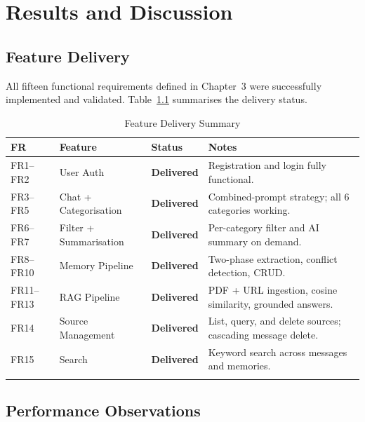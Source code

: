 \documentclass[12pt,a4paper]{report}
\begin{document}
\chapter{Results and Discussion}

\section{Feature Delivery}

All fifteen functional requirements defined in Chapter~3 were successfully implemented and validated. Table~\ref{tab:feature_delivery} summarises the delivery status.

\begin{longtable}{@{}p{0.8cm} p{4cm} p{2cm} p{6cm}@{}}
\toprule
\textbf{FR} & \textbf{Feature} & \textbf{Status} & \textbf{Notes} \\
\midrule
\endhead
FR1--FR2 & User Auth              & \textbf{Delivered} & Registration and login fully functional. \\
FR3--FR5 & Chat + Categorisation  & \textbf{Delivered} & Combined-prompt strategy; all 6 categories working. \\
FR6--FR7 & Filter + Summarisation & \textbf{Delivered} & Per-category filter and AI summary on demand. \\
FR8--FR10 & Memory Pipeline       & \textbf{Delivered} & Two-phase extraction, conflict detection, CRUD. \\
FR11--FR13 & RAG Pipeline         & \textbf{Delivered} & PDF + URL ingestion, cosine similarity, grounded answers. \\
FR14 & Source Management          & \textbf{Delivered} & List, query, and delete sources; cascading message delete. \\
FR15 & Search                     & \textbf{Delivered} & Keyword search across messages and memories. \\
\bottomrule
\caption{Feature Delivery Summary}
\label{tab:feature_delivery}
\end{longtable}

\section{Performance Observations}
\end{document}

